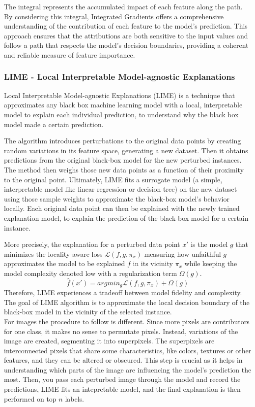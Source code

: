 \documentclass[11pt]{article}
\begin{document}
\begin{multicols*}{2}
The integral represents the accumulated impact of each feature along the path. By considering this integral, Integrated Gradients offers a comprehensive understanding of the contribution of each feature to the model's prediction. This approach ensures that the attributions are both sensitive to the input values and follow a path that respects the model's decision boundaries, providing a coherent and reliable measure of feature importance.

\subsubsection{LIME - Local Interpretable Model-agnostic Explanations}
Local Interpretable Model-agnostic Explanations (LIME) \cite{ribeiro2016should} is a technique that approximates any black box machine learning model with a local, interpretable model to explain each individual prediction, to understand why the black box model made a certain prediction.

The algorithm introduces perturbations to the original data points by creating random variations in its feature space, generating a new dataset. Then it obtains predictions from the original black-box model for the new perturbed instances. 
The method then weighs those new data points as a function of their proximity to the original point. 
Ultimately, LIME fits a surrogate model (a simple, interpretable model like linear regression or decision tree) on the new dataset using those sample weights to approximate the black-box model's behavior locally. Each original data point can then be explained with the newly trained explanation model, to explain the prediction of the black-box model for a certain instance. 

More precisely, the explanation for a perturbed data point $x'$ is the model $g$ that minimizes the locality-aware loss $\mathcal{L}(f, g, \pi_x)$ measuring how unfaithful $g$ approximates the model to be explained $f$ in its vicinity $\pi_x$ while keeping the model complexity denoted low with a regularization term $\Omega(g)$.
$$\hat{f}(x') = argmin_g \mathcal{L}(f, g, \pi_x) + \Omega(g)$$
Therefore, LIME experiences a tradeoff between model fidelity and complexity. The goal of LIME algorithm is to approximate the local decision boundary of the black-box model in the vicinity of the selected instance.\\

For images the procedure to follow is different. Since more pixels are contributors for one class, it makes no sense to permutate pixels. Instead, variations of the image are created, segmenting it into superpixels. The superpixels are interconnected pixels that share some characteristics, like colors, textures or other features, and they can be altered or obscured. This step is crucial as it helps in understanding which parts of the image are influencing the model's prediction the most.
Then, you pass each perturbed image through the model and record the predictions, LIME fits an intepretable model, and the final explanation is then performed on top $n$ labels.


\end{multicols*}
\end{document}
